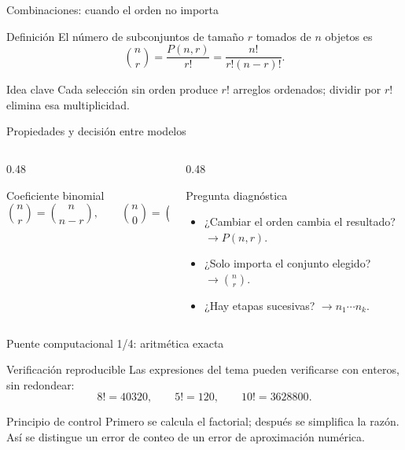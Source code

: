 \documentclass[10pt,aspectratio=169]{beamer}
\begin{document}
\begin{frame}{Combinaciones: cuando el orden no importa}
  \small
  \begin{block}{Definición}
    El número de subconjuntos de tamaño $r$ tomados de $n$ objetos es
    \[
      \binom{n}{r}=\frac{P(n,r)}{r!}=\frac{n!}{r!(n-r)!}.
    \]
  \end{block}
  \begin{exampleblock}{Idea clave}
    Cada selección sin orden produce $r!$ arreglos ordenados; dividir por
    $r!$ elimina esa multiplicidad.
  \end{exampleblock}
\end{frame}

\begin{frame}{Propiedades y decisión entre modelos}
  \footnotesize
  \begin{columns}[T]
    \begin{column}{0.48\textwidth}
      \begin{block}{Coeficiente binomial}
        \[
          \binom{n}{r}=\binom{n}{n-r},\qquad
          \binom{n}{0}=\binom{n}{n}=1.
        \]
      \end{block}
    \end{column}
    \begin{column}{0.48\textwidth}
      \begin{alertblock}{Pregunta diagnóstica}
        \begin{itemize}\itemsep=0.05cm
          \item ¿Cambiar el orden cambia el resultado? $\to P(n,r)$.
          \item ¿Solo importa el conjunto elegido? $\to \binom{n}{r}$.
          \item ¿Hay etapas sucesivas? $\to n_1\cdots n_k$.
        \end{itemize}
      \end{alertblock}
    \end{column}
  \end{columns}
\end{frame}

\begin{frame}{Puente computacional 1/4: aritmética exacta}
  \small
  \begin{block}{Verificación reproducible}
    Las expresiones del tema pueden verificarse con enteros, sin redondear:
    \[
      8!=40320,\qquad 5!=120,\qquad 10!=3628800.
    \]
  \end{block}
  \begin{exampleblock}{Principio de control}
    Primero se calcula el factorial; después se simplifica la razón. Así se
    distingue un error de conteo de un error de aproximación numérica.
  \end{exampleblock}
\end{frame}
\end{document}
